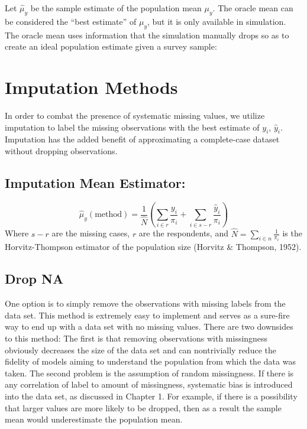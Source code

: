 \documentclass[12pt,twoside]{reedthesis}
\begin{document}
Let \(\hat \mu_y\) be the sample estimate of the population mean
\(\mu_y\). The oracle mean can be considered the ``best estimate'' of
\(\mu_y\), but it is only available in simulation. The oracle mean uses
information that the simulation manually drops so as to create an ideal
population estimate given a survey sample:

\section{Imputation Methods}\label{imputation-methods}

In order to combat the presence of systematic missing values, we utilize
imputation to label the missing observations with the best estimate of
\(y_i\), \(\hat y_i\). Imputation has the added benefit of approximating
a complete-case dataset without dropping observations.

\subsection{Imputation Mean Estimator:}\label{imputation-mean-estimator}

\[
\hat \mu_y(\text{method}) = \frac{1}{\hat N} (\sum_{i \in r} \frac{y_i}{\pi_i} + \sum_{i \in s-r} \frac{\hat y_i}{\pi_i})
\] Where \(s-r\) are the missing cases, \(r\) are the respondents, and
\(\hat N = \sum_{i \in n} \frac{1}{\pi_i}\) is the Horvitz-Thompson
estimator of the population size (Horvitz \& Thompson, 1952).

\subsection{Drop NA}\label{drop-na}

One option is to simply remove the observations with missing labels from
the data set. This method is extremely easy to implement and serves as a
sure-fire way to end up with a data set with no missing values. There
are two downsides to this method: The first is that removing
observations with missingness obviously decreases the size of the data
set and can nontrivially reduce the fidelity of models aiming to
understand the population from which the data was taken. The second
problem is the assumption of random missingness. If there is any
correlation of label to amount of missingness, systematic bias is
introduced into the data set, as discussed in Chapter 1. For example, if
there is a possibility that larger values are more likely to be dropped,
then as a result the sample mean would underestimate the population
mean.
\end{document}
